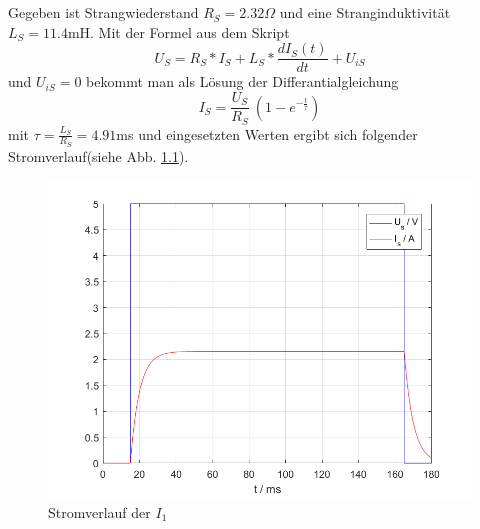 \chapter{}\label{ex:aufg2}

\section{}\label{sec:aufg2a}

%
Gegeben ist Strangwiederstand $R_S = 2.32 \Omega$ und eine Stranginduktivität $L_S= 11.4$mH.
Mit der Formel aus dem Skript
\begin{equation}
	U_S = R_S * I_S + L_S * \frac{dI_S(t)}{dt} + U_{iS}
\end{equation}
und $U_{iS} = 0$ bekommt man als Lösung der Differantialgleichung
\begin{equation}
	I_S = \frac{U_S}{R_S}~( 1 - e^{-\frac{t}{\tau}})
\end{equation}
mit $\tau = \frac{L_S}{R_S} = 4.91$ms und eingesetzten Werten ergibt sich folgender Stromverlauf(siehe Abb. \ref{fig:2a_stromverlauf_I1}).
\begin{figure}[htb]
	\includegraphics[width=\textwidth]{./Bilder/2a_Stromverlauf_1}
	\caption{Stromverlauf der $I_1$}
	\label{fig:2a_stromverlauf_I1}
\end{figure}

